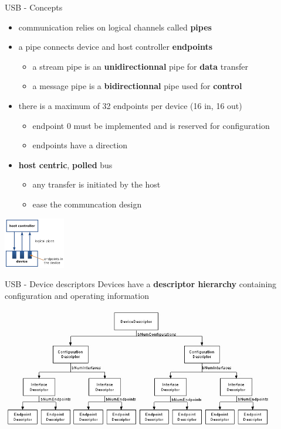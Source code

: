 \begin{frame}{USB - Concepts}
  \begin{itemize}
  \item communication relies on logical channels called \textbf{pipes}
  \item a pipe connects device and host controller \textbf{endpoints}
    \begin{itemize}
    \item a stream pipe is an \textbf{unidirectionnal} pipe for \textbf{data} transfer
    \item a message pipe is a \textbf{bidirectionnal} pipe used for \textbf{control}
    \end{itemize}
  \item there is a maximum of 32 endpoints per device (16 in, 16 out)
    \begin{itemize}
    \item endpoint 0 must be implemented and is reserved for configuration
    \item endpoints have a direction
    \end{itemize}
  \item \textbf{host centric}, \textbf{polled} bus
    \begin{itemize}
    \item any transfer is initiated by the host
    \item ease the communcation design
    \end{itemize}
  \end{itemize}
  \begin{center}
    \includegraphics[width=0.2\textwidth]{figures/usb_host_dev.png}
  \end{center}
\end{frame}

\begin{frame}{USB - Device descriptors}
  Devices have a \textbf{descriptor hierarchy} containing configuration and operating information
  \smallskip
  \begin{center}
    \includegraphics[width=0.9\textwidth]{figures/usb_desc_tree.jpg}
  \end{center}
\end{frame}

